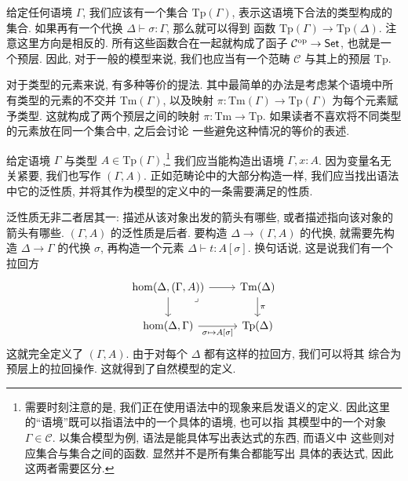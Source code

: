 给定任何语境 \(\Gamma\), 我们应该有一个集合 \(\mathrm{Tp}(\Gamma)\),
表示这语境下合法的类型构成的集合. 如果再有一个代换
\(\Delta \vdash \sigma : \Gamma\), 那么就可以得到
函数 \(\mathrm{Tp}(\Gamma) \to \mathrm{Tp}(\Delta)\).
注意这里方向是相反的.
所有这些函数合在一起就构成了函子
\(\mathcal{C}^\mathrm{op} \to \mathsf{Set}\), 也就是一个预层.
因此, 对于一般的模型来说, 我们也应当有一个范畴
\(\mathcal{C}\) 与其上的预层 \(\mathrm{Tp}\).

对于类型的元素来说, 有多种等价的提法.
其中最简单的办法是考虑某个语境中所有类型的元素的不交并
\(\mathrm{Tm}(\Gamma)\), 以及映射
\(\pi : \mathrm{Tm}(\Gamma) \to \mathrm{Tp}(\Gamma)\)
为每个元素赋予类型.
这就构成了两个预层之间的映射 \(\pi : \mathrm{Tm} \to \mathrm{Tp}\).
如果读者不喜欢将不同类型的元素放在同一个集合中, 之后会讨论
一些避免这种情况的等价的表述.

给定语境 \(\Gamma\) 与类型 \(A \in \mathrm{Tp}(\Gamma)\),\footnote{
需要时刻注意的是, 我们正在使用语法中的现象来启发语义的定义.
因此这里的“语境”既可以指语法中的一个具体的语境, 也可以指
其模型中的一个对象 \(\Gamma \in \mathcal{C}\).
以集合模型为例, 语法是能具体写出表达式的东西, 而语义中
这些则对应集合与集合之间的函数. 显然并不是所有集合都能写出
具体的表达式, 因此这两者需要区分.
} 我们应当能构造出语境 \(\Gamma, x{:}A\).
因为变量名无关紧要, 我们也写作 \((\Gamma, A)\).
正如范畴论中的大部分构造一样, 我们应当找出语法中它的泛性质,
并将其作为模型的定义中的一条需要满足的性质.

泛性质无非二者居其一: 描述从该对象出发的箭头有哪些,
或者描述指向该对象的箭头有哪些. \((\Gamma, A)\) 的泛性质是后者.
要构造 \(\Delta \to (\Gamma, A)\) 的代换,
就需要先构造 \(\Delta \to \Gamma\) 的代换 \(\sigma\),
再构造一个元素 \(\Delta \vdash t : A[\sigma]\).
换句话说, 这是说我们有一个拉回方
\[\begin{tikzcd}
{\hom(\Delta, (\Gamma, A))} & {\mathrm{Tm}(\Delta)} \\
{\hom(\Delta, \Gamma)} & {\mathrm{Tp}(\Delta)}
\arrow["\pi", from=1-2, to=2-2]
\arrow["{\sigma \mapsto A[\sigma]}"', from=2-1, to=2-2]
\arrow[from=1-1, to=2-1]
\arrow[from=1-1, to=1-2]
\arrow["\lrcorner"{anchor=center, pos=0.125}, draw=none, from=1-1, to=2-2]
\end{tikzcd}\]
这就完全定义了 \((\Gamma, A)\).
由于对每个 \(\Delta\) 都有这样的拉回方, 我们可以将其
综合为预层上的拉回操作. 这就得到了自然模型的定义.

